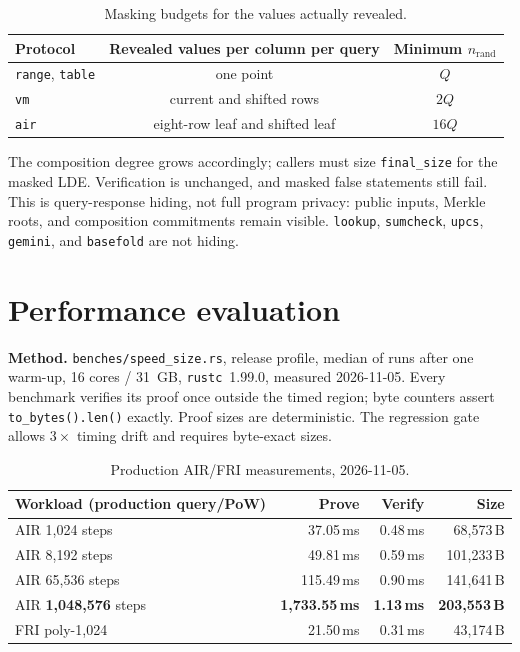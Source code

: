 \documentclass[11pt,a4paper]{article}
\begin{document}
\begin{table}[h]
\centering
\small
\begin{tabular}{@{}lcc@{}}
\toprule
Protocol & Revealed values per column per query & Minimum $n_{\mathrm{rand}}$ \\
\midrule
\texttt{range}, \texttt{table} & one point & $Q$ \\
\texttt{vm} & current and shifted rows & $2Q$ \\
\texttt{air} & eight-row leaf and shifted leaf & $16Q$ \\
\bottomrule
\end{tabular}
\caption{Masking budgets for the values actually revealed.}
\end{table}

The composition degree grows accordingly; callers must size
\texttt{final\_size} for the masked LDE. Verification is unchanged, and
masked false statements still fail. This is query-response hiding, not full
program privacy: public inputs, Merkle roots, and composition commitments
remain visible. \texttt{lookup}, \texttt{sumcheck}, \texttt{upcs},
\texttt{gemini}, and \texttt{basefold} are not hiding.

\section{Performance evaluation}

\textbf{Method.} \texttt{benches/speed\_size.rs}, release profile, median of
runs after one warm-up, 16 cores / 31~GB, \texttt{rustc}~1.99.0, measured
2026-11-05. Every benchmark verifies its proof once outside the timed region;
byte counters assert \texttt{to\_bytes().len()} exactly. Proof sizes are
deterministic. The regression gate allows $3\times$ timing drift and requires
byte-exact sizes.

\begin{table}[h]
\centering
\small
\begin{tabular}{@{}lrrr@{}}
\toprule
Workload (production query/PoW) & Prove & Verify & Size \\
\midrule
AIR 1,024 steps & 37.05\,ms & 0.48\,ms & 68,573\,B \\
AIR 8,192 steps & 49.81\,ms & 0.59\,ms & 101,233\,B \\
AIR 65,536 steps & 115.49\,ms & 0.90\,ms & 141,641\,B \\
AIR \textbf{1,048,576} steps & \textbf{1,733.55\,ms} & \textbf{1.13\,ms} & \textbf{203,553\,B} \\
FRI poly-1,024 & 21.50\,ms & 0.31\,ms & 43,174\,B \\
\bottomrule
\end{tabular}
\caption{Production AIR/FRI measurements, 2026-11-05.}
\end{table}
\end{document}
